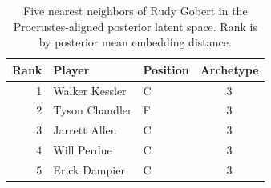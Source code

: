\begin{table}[htbp]
  \centering\small
  \begin{tabular}{rllc}
    \toprule
    Rank & Player & Position & Archetype \\
    \midrule
    1 & Walker Kessler & C & 3 \\
    2 & Tyson Chandler & F & 3 \\
    3 & Jarrett Allen & C & 3 \\
    4 & Will Perdue & C & 3 \\
    5 & Erick Dampier & C & 3 \\
    \bottomrule
  \end{tabular}
  \caption{Five nearest neighbors of Rudy Gobert in the Procrustes-aligned posterior latent space. Rank is by posterior mean embedding distance.}
  \label{tab:Rudy_Gobert_neighbors}
\end{table}

